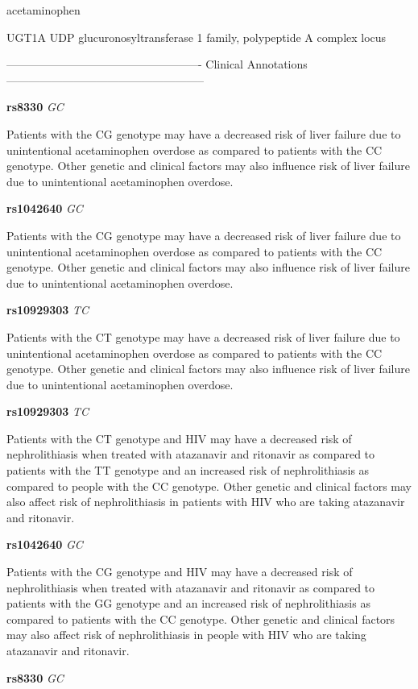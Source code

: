 \documentclass{resume} %
\begin{document}
\begin{rSection}{ acetaminophen }
\begin{rSubsection}{ UGT1A }{ UDP glucuronosyltransferase 1 family, polypeptide A complex locus }{}{}
\item[]

\item[] ---------------------------------------------------- Clinical Annotations -----------------------------------------------------\newline
\item \textbf{ rs8330 } \textit{ GC }
\item[] Patients with the CG genotype may have a decreased risk of liver failure due to unintentional acetaminophen overdose as compared to patients with the CC genotype. Other genetic and clinical factors may also influence risk of liver failure due to unintentional acetaminophen overdose.\item \textbf{ rs1042640 } \textit{ GC }
\item[] Patients with the CG genotype may have a decreased risk of liver failure due to unintentional acetaminophen overdose as compared to patients with the CC genotype. Other genetic and clinical factors may also influence risk of liver failure due to unintentional acetaminophen overdose.\item \textbf{ rs10929303 } \textit{ TC }
\item[] Patients with the CT genotype may have a decreased risk of liver failure due to unintentional acetaminophen overdose as compared to patients with the CC genotype. Other genetic and clinical factors may also influence risk of liver failure due to unintentional acetaminophen overdose.\item \textbf{ rs10929303 } \textit{ TC }
\item[] Patients with the CT genotype and HIV may have a decreased risk of nephrolithiasis when treated with atazanavir and ritonavir as compared to patients with the TT genotype and an increased risk of nephrolithiasis as compared to people with the CC genotype. Other genetic and clinical factors may also affect risk of nephrolithiasis in patients with HIV who are taking atazanavir and ritonavir. \item \textbf{ rs1042640 } \textit{ GC }
\item[] Patients with the CG genotype and HIV may have a decreased risk of nephrolithiasis when treated with atazanavir and ritonavir as compared to patients with the GG genotype and an increased risk of nephrolithiasis as compared to patients with the CC genotype. Other genetic and clinical factors may also affect risk of nephrolithiasis in people with HIV who are taking atazanavir and ritonavir.\item \textbf{ rs8330 } \textit{ GC }

\end{rSubsection}
\end{rSection}
\end{document}
